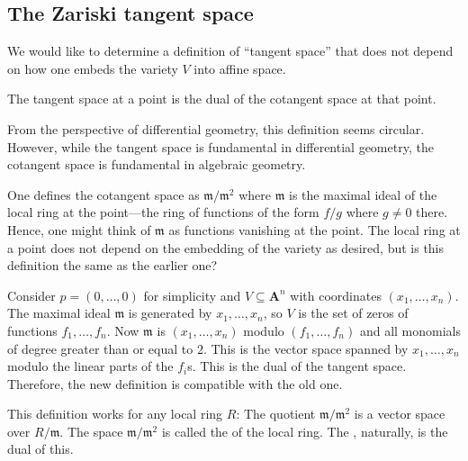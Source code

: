 \documentclass[11pt, oneside,margin=1in]{article}
\begin{document}
\subsection{The Zariski tangent space}

We would like to determine a definition of ``tangent space'' that does not depend on how one embeds the variety $V$ into affine space.

 \begin{definition}[ ]\label{}\text{}
The tangent space at a point is the dual of the cotangent space at that point.
\end{definition}

\begin{remark}
	From the perspective of differential geometry, this definition seems circular. However, while the tangent space is fundamental in differential geometry, the cotangent space is fundamental in algebraic geometry.
\end{remark}

One defines the cotangent space as $\mathfrak{m}/\mathfrak{m}^2$ where $\mathfrak{m}$ is the maximal ideal of the local ring at the point---the ring of functions of the form $f/g$ where $g\ne 0$ there. Hence, one might think of $\mathfrak{m}$ as functions vanishing at the point. The local ring at a point does not depend on the embedding of the variety as desired, but is this definition the same as the earlier one?

Consider $p= (0,\hdots, 0)$ for simplicity and $V\subseteq \mathbf{A}^n$ with coordinates $(x_1,\hdots, x_n)$. The maximal ideal $\mathfrak{m}$ is generated by $x_1,\hdots,x_n$, so $V$ is the set of zeros of functions $f_1,\hdots, f_n$. Now $\mathfrak{m}$ is $(x_1,\hdots, x_n)$ modulo $(f_1,\hdots, f_n)$ and all monomials of degree greater than or equal to $2$. This is the vector space spanned by $x_1,\hdots, x_n$ modulo the linear parts of the $f_i$s. This is the dual of the tangent space. Therefore, the new definition is compatible with the old one.

\begin{remark}
	This definition works for any local ring $R$: The quotient $\mathfrak{m}/\mathfrak{m}^2$ is a vector space over $R/\mathfrak{m}$. The space $\mathfrak{m}/\mathfrak{m}^2$ is called the  of the local ring. The , naturally, is the dual of this.
\end{remark}
\end{document}
